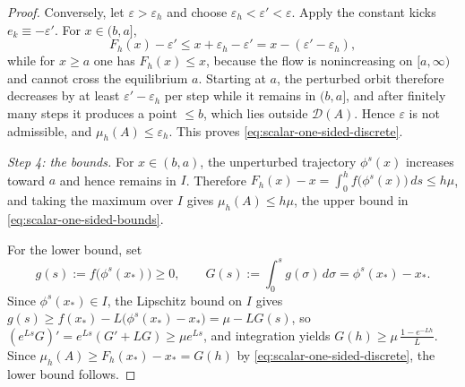 \documentclass[10pt,a4paper]{amsart}
\begin{document}
\begin{proof}
Conversely, let $\varepsilon>\varepsilon_h$ and choose
$\varepsilon_h<\varepsilon'<\varepsilon$. Apply the constant kicks
$e_k\equiv-\varepsilon'$. For $x\in(b,a]$,
\[
    F_h(x)-\varepsilon'
    \leq
    x+\varepsilon_h-\varepsilon'
    =
    x-(\varepsilon'-\varepsilon_h),
\]
while for $x\geq a$ one has $F_h(x)\leq x$, because the flow is
nonincreasing on $[a,\infty)$ and cannot cross the equilibrium $a$.
Starting at $a$, the perturbed orbit therefore decreases by at least
$\varepsilon'-\varepsilon_h$ per step while it remains in $(b,a]$, and
after finitely many steps it produces a point $\leq b$, which lies
outside $\mathcal D(A)$. Hence $\varepsilon$ is not admissible, and
$\mu_h(A)\leq\varepsilon_h$. This proves
\eqref{eq:scalar-one-sided-discrete}.

\emph{Step 4: the bounds.}
For $x\in(b,a)$, the unperturbed trajectory $\phi^s(x)$ increases
toward $a$ and hence remains in $I$. Therefore
    $F_h(x)-x
    =
    \int_0^h f\bigl(\phi^s(x)\bigr)\,ds
    \leq
    h\mu$,
and taking the maximum over $I$ gives $\mu_h(A)\leq h\mu$, the upper
bound in \eqref{eq:scalar-one-sided-bounds}.

For the lower bound, set
\[
    g(s):=f\bigl(\phi^s(x_*)\bigr)\geq0,
    \qquad
    G(s):=\int_0^s g(\sigma)\,d\sigma
    =
    \phi^s(x_*)-x_*.
\]
Since $\phi^s(x_*)\in I$, the Lipschitz bound on $I$ gives
    $g(s)
    \geq
    f(x_*)-L\bigl(\phi^s(x_*)-x_*\bigr)
    =
    \mu-LG(s)$,
so $(e^{Ls}G)'=e^{Ls}(G'+LG)\geq\mu e^{Ls}$, and integration yields
    $G(h)\geq\mu\,\frac{1-e^{-Lh}}{L}$.
Since $\mu_h(A)\geq F_h(x_*)-x_*=G(h)$ by
\eqref{eq:scalar-one-sided-discrete}, the lower bound follows.
\end{proof}
\end{document}
